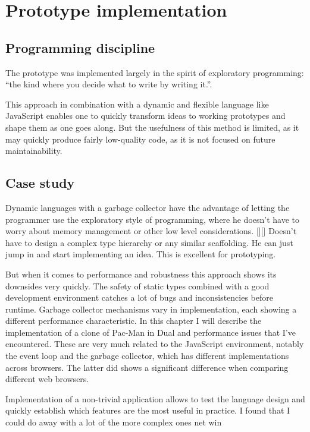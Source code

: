 \chapter{Prototype implementation}\label{chap:case}
\section{Programming discipline}
The prototype was implemented largely in the spirit of exploratory programming:
``the kind where you decide what to write by writing
it.''\cite{arc}.

This approach in combination with a dynamic and flexible language like
JavaScript enables one to quickly transform ideas to working prototypes and
shape them as one goes along. But the usefulness of this method is limited, as
it may quickly produce fairly low-quality code, as it is not focused on future
maintainability.

\section{Case study}
Dynamic languages with a garbage collector have the advantage of letting the
programmer use the exploratory style of programming, where he doesn't have to
worry about memory management or other low level considerations. [][] Doesn't
have to design a complex type hierarchy or any similar scaffolding. He can just
jump in and start implementing an idea. This is excellent for prototyping.

But when it comes to performance and robustness this approach shows its
downsides very quickly. The safety of static types combined with a good
development environment catches a lot of bugs and inconsistencies before
runtime. Garbage collector mechanisms vary in implementation, each showing a
different performance characteristic. In this chapter I will describe the
implementation of a clone of Pac-Man in Dual and performance issues that I've
encountered. These are very much related to the JavaScript environment, notably
the event loop and the garbage collector, which has different implementations
across browsers. The latter did shows a significant difference when comparing
different web browsers.

Implementation of a non-trivial application allows to test the language design
and quickly establish which features are the most useful in practice.  I found
that I could do away with a lot of the more complex ones %
net win

